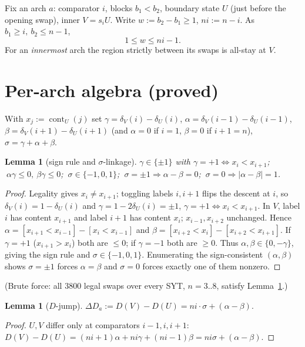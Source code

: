 \documentclass[11pt]{article}
\theoremstyle{plain}
\newtheorem{lemma}[theorem]{Lemma}
\theoremstyle{remark}
\newcommand{\cont}{\operatorname{cont}}
\begin{document}
Fix an arch $a$: comparator $i$, blocks $b_1<b_2$, boundary state $U$ (just before the
opening swap), inner $V=s_iU$. Write $w:=b_2-b_1\ge1$, $ni:=n-i$. As $b_1\ge i,\ b_2\le n-1$,
\begin{equation}\label{eq:w}
1\le w\le ni-1.
\end{equation}
For an \emph{innermost} arch the region strictly between its swaps is all-stay at $V$.

\section{Per-arch algebra (proved)}
With $x_j:=\cont_U(j)$ set
$\gamma=\delta_V(i)-\delta_U(i)$, $\alpha=\delta_V(i{-}1)-\delta_U(i{-}1)$,
$\beta=\delta_V(i{+}1)-\delta_U(i{+}1)$ (and $\alpha=0$ if $i=1$, $\beta=0$ if $i+1=n$),
$\sigma=\gamma+\alpha+\beta$.

\begin{lemma}[sign rule and $\sigma$-linkage]\label{lem:sign}
$\gamma\in\{\pm1\}$ with $\gamma=+1\iff x_i<x_{i+1}$; $\ \alpha\gamma\le0,\ \beta\gamma\le0$;
$\ \sigma\in\{-1,0,1\}$; $\ \sigma=\pm1\Rightarrow\alpha-\beta=0$;
$\ \sigma=0\Rightarrow|\alpha-\beta|=1$.
\end{lemma}
\begin{proof}
Legality gives $x_i\ne x_{i+1}$; toggling labels $i,i{+}1$ flips the descent at $i$, so
$\delta_V(i)=1-\delta_U(i)$ and $\gamma=1-2\delta_U(i)=\pm1$, $\gamma=+1\iff x_i<x_{i+1}$.
In $V$, label $i$ has content $x_{i+1}$ and label $i{+}1$ has content $x_i$; $x_{i-1},x_{i+2}$
unchanged. Hence $\alpha=[x_{i+1}<x_{i-1}]-[x_i<x_{i-1}]$ and
$\beta=[x_{i+2}<x_i]-[x_{i+2}<x_{i+1}]$. If $\gamma=+1$ ($x_{i+1}>x_i$) both are $\le0$; if
$\gamma=-1$ both are $\ge0$. Thus $\alpha,\beta\in\{0,-\gamma\}$, giving the sign rule and
$\sigma\in\{-1,0,1\}$. Enumerating the sign-consistent $(\alpha,\beta)$ shows $\sigma=\pm1$
forces $\alpha=\beta$ and $\sigma=0$ forces exactly one of them nonzero.
\end{proof}
\noindent (Brute force: all $3800$ legal swaps over every SYT, $n=3..8$, satisfy
Lemma~\ref{lem:sign}.)

\begin{lemma}[$D$-jump]\label{lem:dj}
$\Delta D_a:=D(V)-D(U)=ni\cdot\sigma+(\alpha-\beta).$
\end{lemma}
\begin{proof}
$U,V$ differ only at comparators $i{-}1,i,i{+}1$:
$D(V)-D(U)=(ni{+}1)\alpha+ni\gamma+(ni{-}1)\beta=ni\sigma+(\alpha-\beta)$.
\end{proof}
\end{document}
